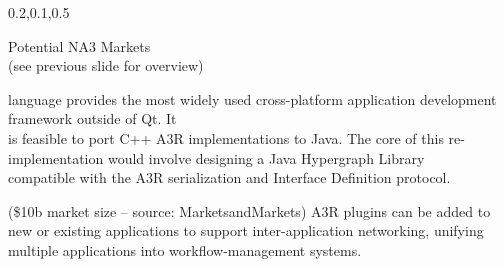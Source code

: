 \begin{frame}{}
{\begin{center}
\begin{minipage}{\textwidth}
{\begin{minipage}{\textwidth}
\begin{lightquadblockc}{0.2,0.1,0.5}{\parbox{21cm}{\vspace*{10pt}\centering Potential NA3 Markets \\(see previous slide for overview)\vspace*{10pt}}}
\begin{minipage}{1.1\textwidth}
{\begin{description}
language provides the most widely used cross-platform 
application development framework outside of Qt.  
It \\is feasible to port C++ A3R implementations 
to Java.  The core of this re-implementation would 
involve designing a Java Hypergraph Library \\compatible 
with the A3R serialization and Interface Definition 
protocol.\vspace{10pt}
\item[Workflow Management] 
({\texttildelow}\$10b market size -- 
source: 
{\selectfont MarketsandMarkets}) 
A3R plugins can be added to new or existing 
applications to support inter-application 
networking, unifying multiple applications into workflow-management systems.
\vspace{.75em}  
\end{description}}\end{minipage}
\end{lightquadblockc}
\end{minipage}}


\end{minipage}
\end{center}
}

\end{frame}
